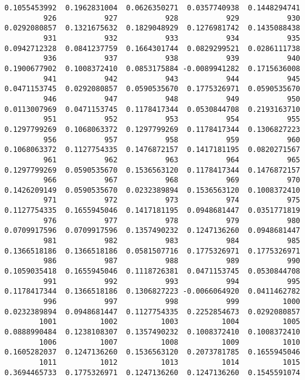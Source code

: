 \documentclass[
  letterpaper,
  DIV=11,
  numbers=noendperiod]{scrreprt}
\begin{document}
\begin{verbatim}
 0.1055453992  0.1962831004  0.0626350271  0.0357740938  0.1448294741 
          926           927           928           929           930 
 0.0292080857  0.1321675632  0.1829048929  0.1276981742  0.1435088438 
          931           932           933           934           935 
 0.0942712328  0.0841237759  0.1664301744  0.0829299521  0.0286111738 
          936           937           938           939           940 
 0.1900677902  0.1008372410  0.0853175884 -0.0089941282  0.1715636008 
          941           942           943           944           945 
 0.0471153745  0.0292080857  0.0590535670  0.1775326971  0.0590535670 
          946           947           948           949           950 
 0.0113007969  0.0471153745  0.1178417344  0.0530844708  0.2193163710 
          951           952           953           954           955 
 0.1297799269  0.1068063372  0.1297799269  0.1178417344  0.1306827223 
          956           957           958           959           960 
 0.1068063372  0.1127754335  0.1476872157  0.1417181195  0.0820271567 
          961           962           963           964           965 
 0.1297799269  0.0590535670  0.1536563120  0.1178417344  0.1476872157 
          966           967           968           969           970 
 0.1426209149  0.0590535670  0.0232389894  0.1536563120  0.1008372410 
          971           972           973           974           975 
 0.1127754335  0.1655945046  0.1417181195  0.0948681447  0.0351771819 
          976           977           978           979           980 
 0.0709917596  0.0709917596  0.1357490232  0.1247136260  0.0948681447 
          981           982           983           984           985 
 0.1366518186  0.1366518186  0.0581507716  0.1775326971  0.1775326971 
          986           987           988           989           990 
 0.1059035418  0.1655945046  0.1118726381  0.0471153745  0.0530844708 
          991           992           993           994           995 
 0.1178417344  0.1366518186  0.1306827223 -0.0066064920  0.0411462782 
          996           997           998           999          1000 
 0.0232389894  0.0948681447  0.1127754335  0.2252854673  0.0292080857 
         1001          1002          1003          1004          1005 
 0.0888990484  0.1238108307  0.1357490232  0.1008372410  0.1008372410 
         1006          1007          1008          1009          1010 
 0.1605282037  0.1247136260  0.1536563120  0.2073781785  0.1655945046 
         1011          1012          1013          1014          1015 
 0.3694465733  0.1775326971  0.1247136260  0.1247136260  0.1545591074 

\end{verbatim}
\end{document}
